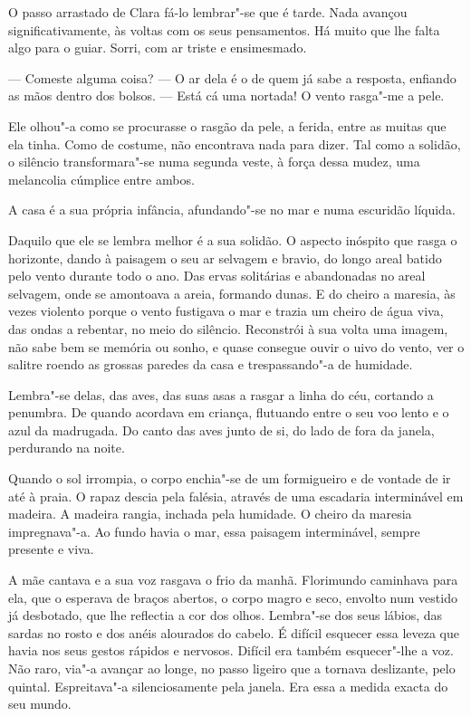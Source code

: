 O passo arrastado de Clara fá-lo lembrar"-se que é tarde. Nada avançou
significativamente, às voltas com os seus pensamentos. Há muito que lhe
falta algo para o guiar. Sorri, com ar triste e ensimesmado.

--- Comeste alguma coisa? --- O ar dela é o de quem já sabe a resposta,
enfiando as mãos dentro dos bolsos. --- Está cá uma nortada! O vento
rasga"-me a pele.

Ele olhou"-a como se procurasse o rasgão da pele, a ferida, entre as
muitas que ela tinha. Como de costume, não encontrava nada para dizer.
Tal como a solidão, o silêncio transformara"-se numa segunda veste, à
força dessa mudez, uma melancolia cúmplice entre ambos.

A casa é a sua própria infância, afundando"-se no mar e numa escuridão
líquida.

Daquilo que ele se lembra melhor é a sua solidão. O aspecto inóspito que
rasga o horizonte, dando à paisagem o seu ar selvagem e bravio, do longo
areal batido pelo vento durante todo o ano. Das ervas solitárias e
abandonadas no areal selvagem, onde se amontoava a areia, formando
dunas. E do cheiro a maresia, às vezes violento porque o vento fustigava
o mar e trazia um cheiro de água viva, das ondas a rebentar, no meio do
silêncio. Reconstrói à sua volta uma imagem, não sabe bem se memória ou
sonho, e quase consegue ouvir o uivo do vento, ver o salitre roendo as
grossas paredes da casa e trespassando"-a de humidade.

Lembra"-se delas, das aves, das suas asas a rasgar a linha do céu,
cortando a penumbra. De quando acordava em criança, flutuando entre o
seu voo lento e o azul da madrugada. Do canto das aves junto de si, do
lado de fora da janela, perdurando na noite.

Quando o sol irrompia, o corpo enchia"-se de um formigueiro e de vontade
de ir até à praia. O rapaz descia pela falésia, através de uma escadaria
interminável em madeira. A madeira rangia, inchada pela humidade. O
cheiro da maresia impregnava"-a. Ao fundo havia o mar, essa paisagem
interminável, sempre presente e viva.

A mãe cantava e a sua voz rasgava o frio da manhã. Florimundo caminhava
para ela, que o esperava de braços abertos, o corpo magro e seco,
envolto num vestido já desbotado, que lhe reflectia a cor dos olhos.
Lembra"-se dos seus lábios, das sardas no rosto e dos anéis alourados do
cabelo. É difícil esquecer essa leveza que havia nos seus gestos rápidos
e nervosos. Difícil era também esquecer"-lhe a voz. Não raro, via"-a
avançar ao longe, no passo ligeiro que a tornava deslizante, pelo
quintal. Espreitava"-a silenciosamente pela janela. Era essa a medida
exacta do seu mundo.

